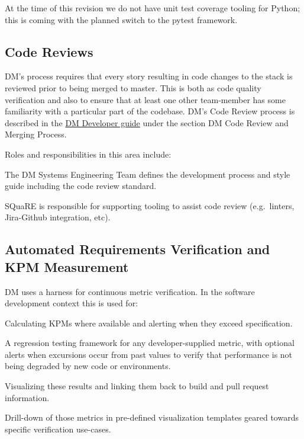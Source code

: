 At the time of this revision we do not have unit test coverage tooling for Python; this is coming with the planned switch to the pytest framework.

\subsection{Code Reviews}

DM’s process requires that every story resulting in code changes to the stack is reviewed prior to being merged to master. This is both as code quality verification and also to ensure that at least one other team-member has some familiarity with a particular part of the codebase. DM’s Code Review process is described in the \href{https://developer.lsst.io}{DM Developer guide} under the section DM Code Review and Merging Process.

Roles and responsibilities in this area include:

\begin{itemize_single}

\item The DM Systems Engineering Team defines the development process and style guide including the code review standard.

\item SQuaRE is responsible for supporting tooling to assist code review (e.g.\ linters, Jira-Github integration, etc).

\end{itemize_single}

\subsection{Automated Requirements Verification and KPM Measurement}

DM uses a harness for continuous metric verification. In the software development context this is used for:

\begin{itemize_single}

\item Calculating KPMs where available and alerting when they exceed specification.

\item A regression testing framework for any developer-supplied metric, with optional alerts when excursions occur from past values to verify that performance is not being degraded by new code or environments.

\item Visualizing these results and linking them back to build and pull request information.

\item  Drill-down of those metrics in pre-defined visualization templates geared towards specific verification use-cases.

\end{itemize_single}

